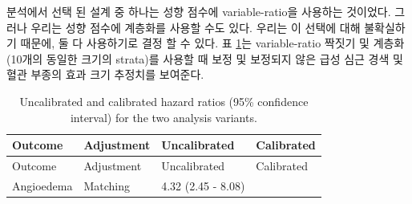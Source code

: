 \documentclass[11pt]{book}
\theoremstyle{definition}
\theoremstyle{definition}
\theoremstyle{definition}
\theoremstyle{remark}
\begin{document}
분석에서 선택 된 설계 중 하나는 성향 점수에 variable-ratio을 사용하는
것이었다. 그러나 우리는 성향 점수에 계층화를 사용할 수도 있다. 우리는 이
선택에 대해 불확실하기 때문에, 둘 다 사용하기로 결정 할 수 있다. 표
\ref{tab:sensAnalysis}는 variable-ratio 짝짓기 및 계층화 (10개의 동일한
크기의 strata)를 사용할 때 보정 및 보정되지 않은 급성 심근 경색 및 혈관
부종의 효과 크기 추정치를 보여준다.

\begin{longtable}[]{@{}llll@{}}
\caption{\label{tab:sensAnalysis} Uncalibrated and calibrated hazard ratios
(95\% confidence interval) for the two analysis
variants.}\tabularnewline
\toprule
\begin{minipage}[b]{0.27\columnwidth}\raggedright\strut
Outcome\strut
\end{minipage} & \begin{minipage}[b]{0.15\columnwidth}\raggedright\strut
Adjustment\strut
\end{minipage} & \begin{minipage}[b]{0.17\columnwidth}\raggedright\strut
Uncalibrated\strut
\end{minipage} & \begin{minipage}[b]{0.17\columnwidth}\raggedright\strut
Calibrated\strut
\end{minipage}\tabularnewline
\midrule
\endfirsthead
\toprule
\begin{minipage}[b]{0.27\columnwidth}\raggedright\strut
Outcome\strut
\end{minipage} & \begin{minipage}[b]{0.15\columnwidth}\raggedright\strut
Adjustment\strut
\end{minipage} & \begin{minipage}[b]{0.17\columnwidth}\raggedright\strut
Uncalibrated\strut
\end{minipage} & \begin{minipage}[b]{0.17\columnwidth}\raggedright\strut
Calibrated\strut
\end{minipage}\tabularnewline
\midrule
\endhead
\begin{minipage}[t]{0.27\columnwidth}\raggedright\strut
Angioedema\strut
\end{minipage} & \begin{minipage}[t]{0.15\columnwidth}\raggedright\strut
Matching\strut
\end{minipage} & \begin{minipage}[t]{0.17\columnwidth}\raggedright\strut
4.32 (2.45 - 8.08)\strut
\end{minipage} & \begin{minipage}[t]{0.17\columnwidth}\raggedright\strut

\end{minipage}
\end{longtable}
\end{document}
